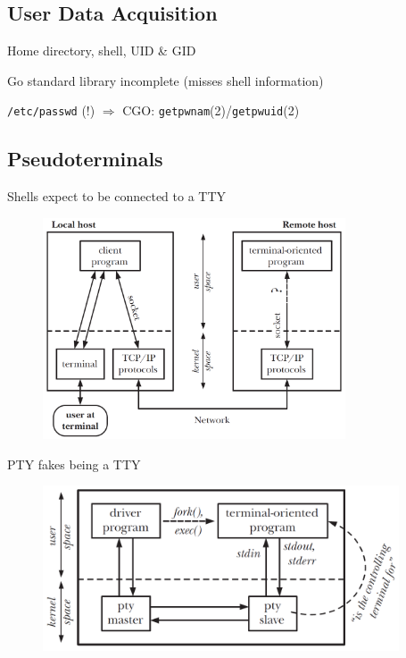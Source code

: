 \documentclass[
	xcolor=dvipsnames,
	handout
]{beamer}
\newenvironment{zhawframe}[1][]
{\begin{frame}[environment=fr,#1]{\insertsubsectionhead}{\insertsectionhead}}
{\end{frame}
}
\begin{document}
\subsection{User Data Acquisition}
\begin{zhawframe}
 Home directory, shell, UID \& GID

 Go standard library incomplete (misses shell information)

 \texttt{/etc/passwd} (!) $\Rightarrow$ CGO: \texttt{getpwnam}(2)/\texttt{getpwuid}(2)
\end{zhawframe}

\subsection{Pseudoterminals}
\begin{zhawframe}
Shells expect to be connected to a TTY
\begin{figure}[ht]
\includegraphics[width=0.8\textwidth]{PseudoterminalProblem}
\end{figure}
\end{zhawframe}

\begin{zhawframe}
PTY fakes being a TTY
\begin{figure}[ht]
\includegraphics[width=0.94\textwidth]{Pseudoterminal}
\end{figure}
\end{zhawframe}
\end{document}
